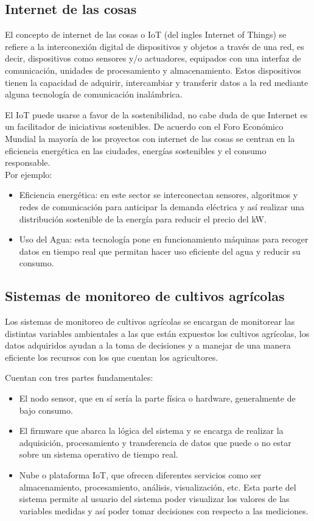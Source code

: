 \subsection{Internet de las cosas}
El concepto de internet de las cosas o IoT (del ingles Internet of Things) se refiere a la interconexión digital de dispositivos y objetos a través de una red, es decir, dispositivos como sensores y/o actuadores, equipados con una interfaz de comunicación, unidades de procesamiento y almacenamiento. Estos dispositivos tienen la capacidad de adquirir, intercambiar y transferir datos a la red mediante alguna tecnología de comunicación inalámbrica\citep{WirelessComunications}.

El IoT puede usarse a favor de la sostenibilidad, no cabe duda de que Internet es un facilitador de iniciativas sostenibles. De acuerdo con el Foro Económico Mundial la mayoría de los proyectos con internet de las cosas se centran en la eficiencia energética en las ciudades, energías sostenibles y el consumo responsable\citep{InternetDeLasCosas}. 
\\Por ejemplo:
\begin{itemize}
  \item Eficiencia energética: en este sector se interconectan sensores, algoritmos y redes de comunicación para anticipar la demanda eléctrica y así realizar una distribución sostenible de la energía para reducir el precio del kW.
  \item Uso del Agua: esta tecnología pone en funcionamiento máquinas para recoger datos en tiempo real que permitan hacer uso eficiente del agua y reducir su consumo.
  
\end{itemize}

\subsection{Sistemas de monitoreo de cultivos agrícolas}
Los sistemas de monitoreo de cultivos agrícolas se encargan de monitorear
las distintas variables ambientales a las que están expuestos los cultivos agrícolas, los datos adquiridos ayudan a la toma de decisiones y a manejar de una manera eficiente los recursos con los que cuentan los agricultores.

Cuentan con tres partes fundamentales: 
\begin{itemize}
  \item El nodo sensor, que en sí sería la parte física o hardware, generalmente de bajo consumo.
  \item El firmware que abarca la lógica del sistema y se encarga de realizar la adquisición, procesamiento y transferencia de datos que puede o no estar sobre un sistema operativo de tiempo real.
  \item Nube o plataforma IoT, que ofrecen diferentes servicios como ser almacenamiento, procesamiento, análisis, visualización, etc. Esta parte del sistema permite al usuario del sistema poder visualizar los valores de las variables medidas y así poder tomar decisiones con respecto a las mediciones.
\end{itemize}


